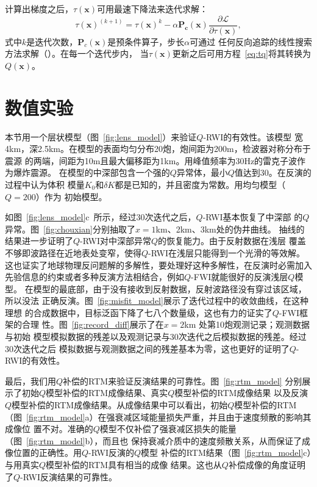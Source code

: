 计算出梯度之后，$\tau(\mathbf{x})$可用最速下降法来迭代求解：
\begin{equation}
    \tau(\mathbf{x})^{(k+1)}=\tau(\mathbf{x})^k-\alpha \mathbf{P_c}(\mathbf{x})
    \frac{\partial \mathcal{L}}{\partial \tau(\mathbf{x})},
\end{equation}
式中$k$是迭代次数，$\mathbf{P}_c(\mathbf{x})$是预条件算子，步长$\alpha$可通过
任何反向追踪的线性搜索方法求解（）。在每一个迭代步内，
当$\tau(\mathbf{x})$更新之后可用方程~\ref{eq:tq}将其转换为$Q(\mathbf{x})$。


\newpage
\section{数值实验}
本节用一个层状模型（图~\ref{fig:lens_model}）来验证$Q$-RWI的有效性。该模型
宽4km，深2.5km。在模型的表面均匀分布20炮，炮间距为200m，检波器对称分布于震源
的两端，间距为10m且最大偏移距为1km。用峰值频率为30Hz的雷克子波作为爆炸震源。
在模型的中深部包含一个强的$Q$异常体，最小$Q$值达到30。在反演的过程中认为体积
模量$K_0$和$\delta K$都是已知的，并且密度为常数。用均匀模型（$Q=200$）作为
初始模型。

如图~\ref{fig:lens_model}c~所示，经过30次迭代之后，$Q$-RWI基本恢复了中深部
的$Q$异常。图~\ref{fig:chouxian}分别抽取了$x=1$km、2km、3km处的伪井曲线。
抽线的结果进一步证明了$Q$-RWI对中深部异常$Q$的恢复能力。由于反射数据在浅层
覆盖不够即波路径在近地表处变窄，使得$Q$-RWI在浅层只能得到一个光滑的等效解。
这也证实了地球物理反问题解的多解性，要处理好这种多解性，在反演时必需加入
先验信息的约束或者多种反演方法相结合，例如$Q$-FWI就能很好的反演浅层$Q$模型。
在模型的最底部，由于没有接收到反射数据，反射波路径没有穿过该区域，所以没法
正确反演。图~\ref{fig:misfit_model}展示了迭代过程中的收敛曲线，在这种理想
的合成数据中，目标泛函下降了七八个数量级，这也有力的证实了$Q$-FWI框架的合理
性。图~\ref{fig:record_diff}展示了在$x=2$km 处第10炮观测记录；观测数据与初始
模型模拟数据的残差以及观测记录与30次迭代之后模拟数据的残差。经过30次迭代之后
模拟数据与观测数据之间的残差基本为零，这也更好的证明了$Q$-RWI的有效性。

最后，我们用$Q$补偿的RTM来验证反演结果的可靠性。图~\ref{fig:rtm_model}
分别展示了初始$Q$模型补偿的RTM成像结果、真实$Q$模型补偿的RTM成像结果
以及反演$Q$模型补偿的RTM成像结果。从成像结果中可以看出，初始$Q$模型补偿的RTM
（图~\ref{fig:rtm_model}a）在强衰减区域能量损失严重，并且由于速度频散的影响其成像位
置不对。准确的$Q$模型不仅补偿了强衰减区损失的能量（图~\ref{fig:rtm_model}b），而且也
保持衰减介质中的速度频散关系，从而保证了成像位置的正确性。用$Q$-RWI反演的$Q$模型
补偿的RTM结果（图~\ref{fig:rtm_model}c）与用真实$Q$模型补偿的RTM具有相当的成像
结果。这也从$Q$补偿成像的角度证明了$Q$-RWI反演结果的可靠性。


